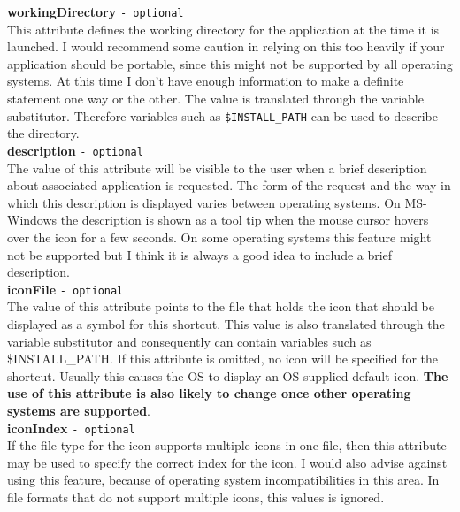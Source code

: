 \textbf{workingDirectory} \texttt{- optional}\\

This attribute defines the working directory for the application at the
time it is launched. I would recommend some caution in relying on this
too heavily if your application should be portable, since this might not
be supported by all operating systems. At this time I don't have enough
information to make a definite statement one way or the other. The value
is translated through the variable substitutor. Therefore variables such
as \texttt{\$INSTALL\_PATH} can be used to describe the directory.\\

\textbf{description} \texttt{- optional}\\

The value of this attribute will be visible to the user when a brief
description about associated application is requested. The form of the
request and the way in which this description is displayed varies
between operating systems. On MS-Windows the description is shown as a
tool tip when the mouse cursor hovers over the icon for a few seconds.
On some operating systems this feature might not be supported but I
think it is always a good idea to include a brief description.\\

\textbf{iconFile} \texttt{- optional}\\

The value of this attribute points to the file that holds the icon that
should be displayed as a symbol for this shortcut. This value is also
translated through the variable substitutor and consequently can contain
variables such as \$INSTALL\_PATH. If this attribute is omitted, no icon
will be specified for the shortcut. Usually this causes the OS to
display an OS supplied default icon. \textbf{The use of this attribute
is also likely to change once other operating systems are supported}.\\

\textbf{iconIndex} \texttt{- optional}\\

If the file type for the icon supports multiple icons in one file, then
this attribute may be used to specify the correct index for the icon. I
would also advise against using this feature, because of operating
system incompatibilities in this area. In file formats that do not
support multiple icons, this values is ignored.\\


